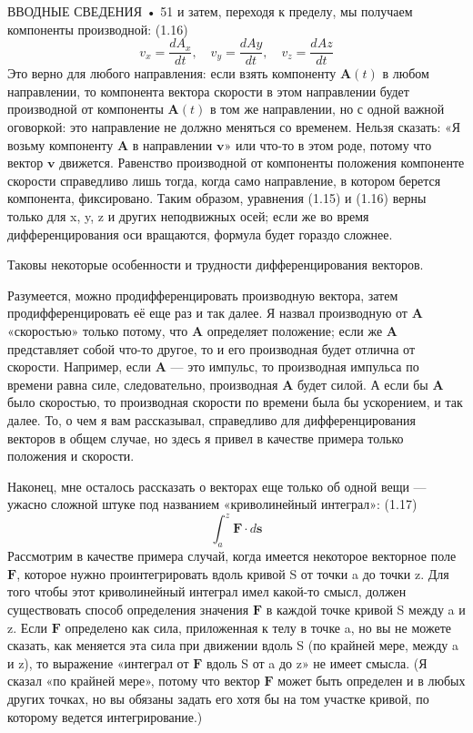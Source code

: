 \documentclass[10pt,oneside]{article}
\newcommand{\TipsSubsection}[1]{\par\vspace{6bp}{\normalsize\bfseries #1\par}\vspace{2bp}}
\begin{document}
ВВОДНЫЕ СВЕДЕНИЯ • 51 и затем, переходя к пределу, мы получаем компоненты производной: (1.16) \[v_x = \frac{dA_x}{dt}, \quad v_y = \frac{dAy}{dt}, \quad v_z = \frac{dAz}{dt}\] Это верно для любого направления: если взять компоненту \(\mathbf{A}(t)\) в любом направлении, то компонента вектора скорости в этом направлении будет производной от компоненты \(\mathbf{A}(t)\) в том же направлении, но с одной важной оговоркой: это направление не должно меняться со временем. Нельзя сказать: «Я возьму компоненту \(\mathbf{A}\) в направлении \(\mathbf{v}\)» или что-то в этом роде, потому что вектор \(\mathbf{v}\) движется. Равенство производной от компоненты положения компоненте скорости справедливо лишь тогда, когда само направление, в котором берется компонента, фиксировано. Таким образом, уравнения (1.15) и (1.16) верны только для x, y, z и других неподвижных осей; если же во время дифференцирования оси вращаются, формула будет гораздо сложнее.\par

Таковы некоторые особенности и трудности дифференцирования векторов.\par

Разумеется, можно продифференцировать производную вектора, затем продифференцировать её еще раз и так далее. Я назвал производную от \(\mathbf{A}\) «скоростью» только потому, что \(\mathbf{A}\) определяет положение; если же \(\mathbf{A}\) представляет собой что-то другое, то и его производная будет отлична от скорости. Например, если \(\mathbf{A}\) --- это импульс, то производная импульса по времени равна силе, следовательно, производная \(\mathbf{A}\) будет силой. А если бы \(\mathbf{A}\) было скоростью, то производная скорости по времени была бы ускорением, и так далее. То, о чем я вам рассказывал, справедливо для дифференцирования векторов в общем случае, но здесь я привел в качестве примера только положения и скорости.\par

\TipsSubsection{1-8 Криволинейные интегралы}

Наконец, мне осталось рассказать о векторах еще только об одной вещи --- ужасно сложной штуке под названием «криволинейный интеграл»: (1.17) \[\int_a^z \mathbf{F} \cdot d\mathbf{s}\] Рассмотрим в качестве примера случай, когда имеется некоторое векторное поле \(\mathbf{F}\), которое нужно проинтегрировать вдоль кривой S от точки a до точки z. Для того чтобы этот криволинейный интеграл имел какой-то смысл, должен существовать способ определения значения \(\mathbf{F}\) в каждой точке кривой S между a и z. Если \(\mathbf{F}\) определено как сила, приложенная к телу в точке a, но вы не можете сказать, как меняется эта сила при движении вдоль S (по крайней мере, между a и z), то выражение «интеграл от \(\mathbf{F}\) вдоль S от a до z» не имеет смысла. (Я сказал «по крайней мере», потому что вектор \(\mathbf{F}\) может быть определен и в любых других точках, но вы обязаны задать его хотя бы на том участке кривой, по которому ведется интегрирование.)\par
\end{document}
